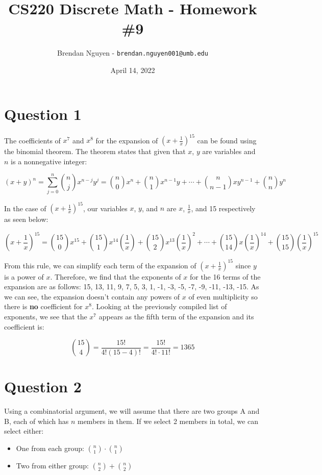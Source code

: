 \documentclass[11pt]{article}
\title{CS220 Discrete Math - Homework \#9}
\author{Brendan Nguyen - \texttt{brendan.nguyen001@umb.edu}}
\date{April 14, 2022}
\begin{document}
\maketitle

\section*{Question 1}
The coefficients of $x^7$ and $x^8$ for the expansion of $(x + \frac{1}{x})^{15}$ can be found using the binomial theorem. The theorem states that given that $x$, $y$ are variables and $n$ is a nonnegative integer:

\[(x+y)^n = \sum_{j=0}^{n} \binom{n}{j}x^{n-j}y^j = \binom{n}{0}x^n + \binom{n}{1}x^{n-1}y + \cdots + \binom{n}{n-1}xy^{n-1} + \binom{n}{n}y^n\]

In the case of $(x + \frac{1}{x})^{15}$, our variables $x$, $y$, and $n$ are $x$, $\frac{1}{x}$, and 15 respectively as seen below:

\[\left(x+ \frac{1}{x}\right)^{15} = \binom{15}{0}x^{15} + \binom{15}{1}x^{14}\left(\frac{1}{x}\right) + \binom{15}{2}x^{13}\left(\frac{1}{x}\right)^2 + \cdots + \binom{15}{14}x\left(\frac{1}{x}\right)^{14} + \binom{15}{15}\left(\frac{1}{x}\right)^{15}\]

From this rule, we can simplify each term of the expansion of $(x + \frac{1}{x})^{15}$ since $y$ is a power of $x$. Therefore, we find that the exponents of $x$ for the 16 terms of the expansion are as follows: 15, 13, 11, 9, 7, 5, 3, 1, -1, -3, -5, -7, -9, -11, -13, -15. As we can see, the expansion doesn't contain any powers of $x$ of even multiplicity so there is \textbf{no} coefficient for $x^8$. Looking at the previously compiled list of exponents, we see that the $x^7$ appears as the fifth term of the expansion and its coefficient is:

\[\binom{15}{4} = \frac{15!}{4!(15-4)!} = \frac{15!}{4! \cdot 11!} = 1365\]

\section*{Question 2}
Using a combinatorial argument, we will assume that there are two groups A and B, each of which has $n$ members in them. If we select 2 members in total, we can select either:

\begin{itemize}
    \item One from each group: $\binom{n}{1} \cdot \binom{n}{1}$
    \item Two from either group: $\binom{n}{2} + \binom{n}{2}$
\end{itemize}
\end{document}
